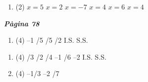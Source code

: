 \documentclass[a4paper, pdf, twoside]{book}
\begin{document}
\begin{multicols}{2}
\begin{enumerate}

 \item[\fontfamily{phv}\selectfont\color{blue}\textbf{4}. ] 
 \begin{tasks}[column-sep=1em, item-indent=1.3333em](2)
	 \task $x=5$
	 \task $x=2$
	 \task $x=-7$
	 \task $x=4$
	 \task $x=6$
	 \task $x=4$
\end{tasks}
 \end{enumerate}
\vspace{0.3cm}


{\textbf{\em Pàgina 78}} \hrulefill
\begin{enumerate}
\vspace{0.25cm}



 \item[\fontfamily{phv}\selectfont\color{blue}\textbf{5}. ]  \scalebox{0.6}{\simbolclau } 
 \begin{tasks}[column-sep=1em, item-indent=1.3333em](4)
	 \task --1
	 /5
	 /5
	 /2
	 \task I.S.
	 \task S.S.
\end{tasks}
 \end{enumerate}
\begin{enumerate}
\vspace{0.25cm}



 \item[\fontfamily{phv}\selectfont\color{blue}\textbf{6}. ]  \scalebox{0.6}{\simbolclau } 
 \begin{tasks}[column-sep=1em, item-indent=1.3333em](4)
	 /3
	 /2
	 /4
	 \task --1
	 /6
	 \task --2
	 \task I.S.
	 \task S.S.
\end{tasks}
\vspace{0.25cm}



 \item[\fontfamily{phv}\selectfont\color{blue}\textbf{7}. ]  \scalebox{0.6}{\simbolclau } 
 \begin{tasks}[column-sep=1em, item-indent=1.3333em](4)
	 \task --1/3
	 \task --2
	 /7
\end{tasks}
 \end{enumerate}
\vspace{0.3cm}


\end{multicols}
\end{document}
